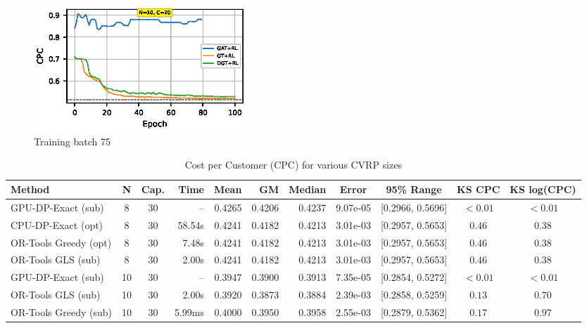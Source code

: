 \documentclass[a4paper,twoside]{article}
\begin{document}
\begin{figure}[t!]
\centering
   \includegraphics[width=80mm]{figures/tiny_n10.eps}
   \caption{Training batch 75}
\label{fig:benchmark}
\end{figure}



\begin{table}[htbp]
\centering
\caption{Cost per Customer (CPC) for various CVRP sizes}
\label{tab:benchmark-comparison}
\small
\begin{tabular}{@{}l c c r r r r c c c c@{}}
\toprule
\textbf{Method} & \textbf{N} & \textbf{Cap.} & \textbf{Time} & \textbf{Mean} & \textbf{GM} & \textbf{Median} & \textbf{Error} & \textbf{95\% Range} & \textbf{KS CPC} & \textbf{KS log(CPC)} \\
\midrule
GPU-DP-Exact (sub)   & 8  & 30 & -- & 0.4265 & 0.4206 & 0.4237 & 9.07e-05 & [0.2966, 0.5696] & $<0.01$ & $<0.01$ \\
CPU-DP-Exact (opt)    & 8 & 30 & 58.54s & 0.4241 & 0.4182 & 0.4213 & 3.01e-03 & [0.2957, 0.5653] & $0.46$ & $0.38$ \\
OR-Tools Greedy (opt) & 8 & 30 & 7.48s & 0.4241 & 0.4182 & 0.4213 & 3.01e-03 & [0.2957, 0.5653] & $0.46$ & $0.38$ \\
OR-Tools GLS (sub)    & 8 & 30 & 2.00s & 0.4241 & 0.4182 & 0.4213 & 3.01e-03 & [0.2957, 0.5653] & $0.46$ & $0.38$ \\
\midrule
GPU-DP-Exact (sub)   & 10 & 30 & --     & 0.3947 & 0.3900 & 0.3913 & 7.35e-05 & [0.2854, 0.5272] & $<0.01$ & $<0.01$ \\
OR-Tools GLS (sub)    & 10 & 30 & 2.00s  & 0.3920 & 0.3873 & 0.3884 & 2.39e-03 & [0.2858, 0.5259] & $0.13$ & $0.70$ \\
OR-Tools Greedy (sub) & 10 & 30 & 5.99ms & 0.4000 & 0.3950 & 0.3958 & 2.55e-03 & [0.2879, 0.5362] & $0.17$ & $0.97$ \\

\end{tabular}
\end{table}
\end{document}
